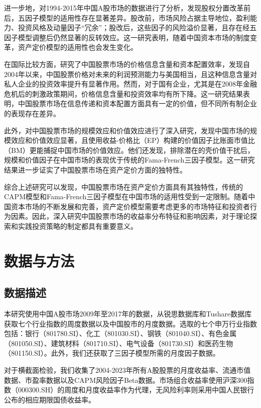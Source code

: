 \documentclass[12pt, a4paper]{article}
\begin{document}
进一步地，\citet{li2017fama}对1994-2015年中国A股市场的数据进行了分析，发现股权分置改革前后，五因子模型的适用性存在显著差异。股改前，市场风险占据主导地位，盈利能力、投资风格及动量因子“冗余”；股改后，这些因子的风险溢价显著，且存在经五因子模型调整后仍然显著的反转效应。这一研究表明，随着中国资本市场的制度变革，资产定价模型的适用性也会发生变化。

在国际比较方面，\citet{carpenter2021real}研究了中国股票市场的价格信息含量和资本配置效率，发现自2004年以来，中国股票价格对未来的利润预测能力与美国相当，且这种信息含量对私人企业的投资效率提升有显著作用。然而，对于国有企业，尤其是在2008年金融危机后的刺激政策期间，价格信息含量和投资效率均有所下降。这一研究结果表明，中国股票市场在信息传递和资本配置方面具有一定的价值，但不同所有制企业的表现存在差异。

此外，\citet{liu2019size}对中国股票市场的规模效应和价值效应进行了深入研究，发现中国市场的规模效应和价值效应显著，且使用收益-价格比（EP）构建的价值因子比账面市值比（BM）更能捕捉中国市场的价值效应。他们还发现，排除潜在的壳价值干扰后，规模和价值因子在中国市场的表现优于传统的Fama-French三因子模型。这一研究结果进一步证实了中国股票市场在资产定价方面的独特性。

综合上述研究可以发现，中国股票市场在资产定价方面具有其独特性，传统的CAPM模型和Fama-French三因子模型在中国市场的适用性受到一定限制。随着中国资本市场的不断发展和完善，资产定价模型需要考虑更多的市场特征和投资者行为因素。因此，深入研究中国股票市场的收益率分布特征和影响因素，对于理论探索和实践投资策略的制定都具有重要意义。

\section{数据与方法}

\subsection{数据描述}

本研究使用中国A股市场2009年至2017年的数据，从锐思数据库和Tushare数据库获取七个行业指数的周度数据以及中国股市的月度数据。选取的七个申万行业指数包括：银行（801780.SI）、化工（801030.SI）、钢铁（801040.SI）、有色金属（801050.SI）、建筑材料（801710.SI）、电气设备（801730.SI）和医药生物（801150.SI）。此外，我们还获取了三因子模型所需的月度因子数据。

对于横截面检验，我们收集了2004-2023年所有A股股票的月度收益率、流通市值数据、市盈率数据以及CAPM风险因子Beta数据。市场组合收益率使用沪深300指数（000300.SH）的周度和月度收益率作为代理，无风险利率则采用中国人民银行公布的相应期限国债收益率。
\end{document}
